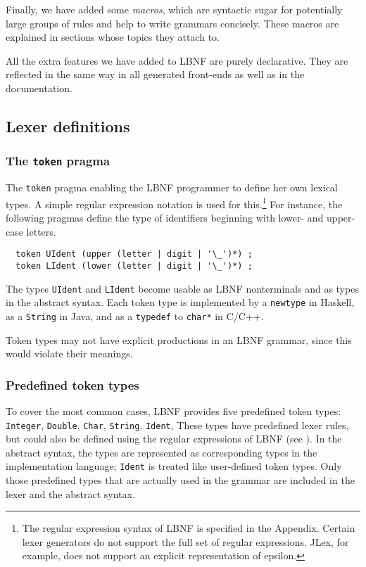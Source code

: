 Finally, we have added some {\em macros}, 
which are syntactic sugar for potentially 
large groups of rules and help to write grammars 
concisely. These macros are explained in sections
whose topics they attach to.

All the extra features we have added to LBNF are purely
declarative. They are reflected in the same way in all generated
front-ends as well as in the documentation.




\subsection{Lexer definitions}
\label{lexer}

\subsubsection{The {\tt token} pragma}

\label{reg}

The {\tt token} pragma enabling the LBNF programmer
to define her own lexical types.
A simple regular expression notation is used for 
this.\footnote{
The regular expression syntax of LBNF is specified in the 
Appendix.
Certain lexer generators do not support the full set of regular
expressions. JLex, for example, does not support an explicit 
representation of epsilon.
}
For instance, the following pragmas define the type of
identifiers beginning with lower- and upper-case letters.
\begin{verbatim}
  token UIdent (upper (letter | digit | '\_')*) ;
  token LIdent (lower (letter | digit | '\_')*) ;
\end{verbatim}
The types {\tt UIdent} and {\tt LIdent} become usable
as LBNF nonterminals and as types in the abstract syntax.
Each token type is implemented by a {\tt newtype} in Haskell, as
a {\tt String} in Java, and as a {\tt typedef} to {\tt char*} in C/C++.

Token types may not have explicit productions in an LBNF
grammar, since this would violate their meanings.



\subsubsection{Predefined token types}

To cover the most common cases, LBNF provides
five predefined token types:
\bequ
{\tt Integer}, %
{\tt Double}, %
{\tt Char}, %
{\tt String}, %
{\tt Ident}, %
\enqu
These types have predefined lexer rules, but could also be defined
using the regular expressions of LBNF (see \cite{bnfc}).
In the abstract syntax, the types are represented as corresponding
types in the implementation language; {\tt Ident} is treated like
user-defined token types.
Only those predefined types that are actually used in
the grammar are included in the lexer and the
abstract syntax. 



